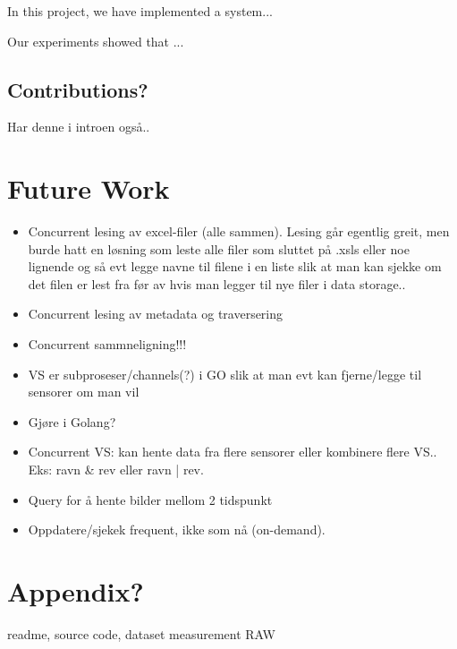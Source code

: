 \documentclass[USenglish]{uit-thesis}
\begin{document}
In this project, we have implemented a system...

Our experiments showed that ...

\section{Contributions?}
Har denne i introen også..

\chapter{Future Work}
\begin{itemize}
\item Concurrent lesing av excel-filer (alle sammen). Lesing går egentlig greit, men burde hatt en løsning som leste alle filer som sluttet på .xsls eller noe lignende og så evt legge navne til filene i en liste slik at man kan sjekke om det filen er lest fra før av hvis man legger til nye filer i data storage..
\item Concurrent lesing av metadata og traversering
\item Concurrent sammneligning!!!
\item VS er subproseser/channels(?) i GO slik at man evt kan fjerne/legge til sensorer om man vil
\item Gjøre i Golang?
\item Concurrent VS: kan hente data fra flere sensorer eller kombinere flere VS.. Eks: ravn \& rev eller ravn | rev.
\item Query for å hente bilder mellom 2 tidspunkt
\item Oppdatere/sjekek frequent, ikke som nå (on-demand).
\end{itemize}


\chapter{Appendix?}
readme, source code, dataset measurement RAW
\backmatter



\newpage{}
\end{document}
